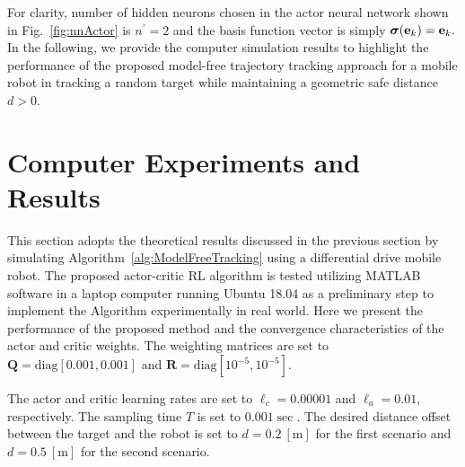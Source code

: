 \documentclass[conference]{IEEEtran}
\begin{document}
For clarity, number of hidden neurons chosen in the actor neural network shown in Fig.~\ref{fig:nnActor} is $n^{'} = 2$ and the basis function vector is simply $\bm{\sigma}({\bf e}_k) = {\bf e}_k.$ In the following, we provide the computer simulation results to highlight the performance of the proposed model-free trajectory tracking approach for a mobile robot in tracking a random target while maintaining a geometric safe distance $d>0.$  
    


  

 \section{Computer Experiments and Results}
 \label{sec:resultsExperiments}

 This section adopts the theoretical results discussed in the previous section by simulating Algorithm~\ref{alg:ModelFreeTracking} using a differential drive mobile robot. The proposed actor-critic RL algorithm is tested  utilizing MATLAB software in a laptop computer running Ubuntu 18.04 as a preliminary step to implement the Algorithm experimentally in real world. Here we present the performance of the proposed method and the convergence characteristics of the actor and critic weights. The weighting matrices are set to $\mathbf{Q} = \mathrm{diag}[0.001,0.001]$ and $\mathbf{R} = \mathrm{diag}[10^{-5}, 10^{-5}].$ %
  
  
 The actor and critic learning rates are set to $\ell_c = 0.00001$ and $\ell_a=0.01,$ respectively. The sampling time $T$ is set to $0.001 \sec.$ The desired distance offset between the target and the robot is set to $ d = 0.2~[\si{\meter}]$ for the first scenario and $d = 0.5~[\si{\meter}]$ for the second scenario. 
\end{document}
